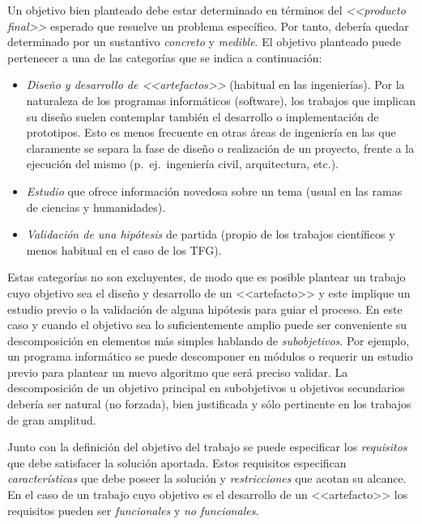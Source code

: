 Un objetivo bien planteado debe estar determinado en términos del \emph{<<producto final>>} esperado que resuelve un problema específico. Por tanto, debería quedar determinado por un sustantivo \emph{concreto} y \emph{medible}. El objetivo planteado puede pertenecer a una de las categorías que se indica a continuación:
\begin{itemize}
	\item \emph{Diseño y desarrollo de <<artefactos>>}
	(habitual en las ingenierías). Por la naturaleza de los programas informáticos (software), los trabajos que implican su diseño suelen contemplar también el desarrollo o implementación de prototipos. Esto es menos frecuente en otras áreas de ingeniería en las que claramente se separa la fase de diseño o realización de un proyecto, frente a la ejecución del mismo (p.~ej.~ingeniería civil, arquitectura, etc.). 
    
	\item \emph{Estudio} que ofrece información novedosa sobre un tema (usual en las ramas de ciencias y humanidades). 
    
	\item \emph{Validación de una 
	hipótesis} de partida (propio de los trabajos 
	científicos y menos habitual en el caso de los TFG).
\end{itemize}

Estas categorías no son excluyentes, de modo que es posible plantear un trabajo cuyo objetivo sea el diseño y desarrollo de un <<artefacto>> y este implique un estudio previo o la validación de alguna hipótesis para guiar el proceso. En este caso y cuando el objetivo sea lo suficientemente amplio puede ser conveniente su descomposición en elementos más simples hablando de \emph{subobjetivos}. Por ejemplo, un programa informático se puede descomponer en módulos o requerir un estudio previo para plantear un nuevo algoritmo que será preciso validar. La descomposición de un objetivo principal en subobjetivos 
u objetivos secundarios debería ser natural (no forzada), bien justificada y 
sólo pertinente en los trabajos de gran amplitud.

Junto con la definición del objetivo del trabajo se puede especificar los \emph{requisitos} que debe satisfacer la solución aportada. Estos requisitos especifican \emph{características} que debe poseer la solución y \emph{restricciones} que acotan su alcance. En el caso de un trabajo cuyo objetivo es el desarrollo de un <<artefacto>> los requisitos pueden ser \emph{funcionales} y \emph{no funcionales}.


